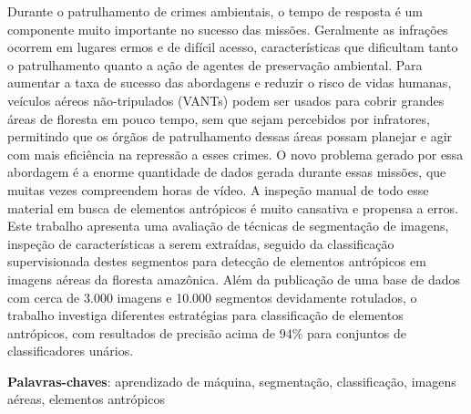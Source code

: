 \begin{resumo}
    Durante o patrulhamento de crimes ambientais, o tempo de resposta é um componente muito importante no sucesso das missões. Geralmente as infrações ocorrem em lugares ermos e de difícil acesso, características que dificultam tanto o patrulhamento quanto a ação de agentes de preservação ambiental. Para aumentar a taxa de sucesso das abordagens e reduzir o risco de vidas humanas, veículos aéreos não-tripulados (VANTs) podem ser usados para cobrir grandes áreas de floresta em pouco tempo, sem que sejam percebidos por infratores, permitindo que os órgãos de patrulhamento dessas áreas possam planejar e agir com mais eficiência na repressão a esses crimes. O novo problema gerado por essa abordagem é a enorme quantidade de dados gerada durante essas missões, que muitas vezes compreendem horas de vídeo. A inspeção manual de todo esse material em busca de elementos antrópicos é muito cansativa e propensa a erros. Este trabalho apresenta uma avaliação de técnicas de segmentação de imagens, inspeção de características a serem extraídas, seguido da classificação supervisionada destes segmentos para detecção de elementos antrópicos em imagens aéreas da floresta amazônica. Além da publicação de uma base de dados com cerca de 3.000 imagens e 10.000 segmentos devidamente rotulados, o trabalho investiga diferentes estratégias para classificação de elementos antrópicos, com resultados de precisão acima de 94\% para conjuntos de classificadores unários.

    \vspace{\onelineskip}
    \noindent
    \textbf{Palavras-chaves}: aprendizado de máquina, segmentação, classificação, imagens aéreas, elementos antrópicos
\end{resumo}

